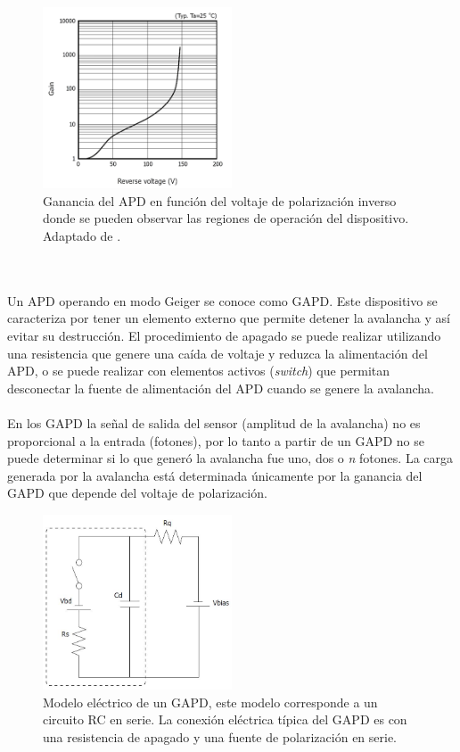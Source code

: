\begin{figure}[h!]
\begin{centering}
  \includegraphics[width=0.5\textwidth]{Images/GAPD_gain.JPG}
  \caption{Ganancia del APD en función del voltaje de polarización inverso donde se pueden observar las regiones de operación del dispositivo. Adaptado de \citep{MPPC_note}.}
  \label{fig:APD_gain}
  \par\end{centering}
\end{figure}
 \\ \\
Un APD operando en modo Geiger se conoce como GAPD. Este dispositivo se caracteriza por tener un elemento externo que permite detener la avalancha y así evitar su destrucción. El procedimiento de apagado se puede realizar utilizando una resistencia que genere una caída de voltaje y reduzca la alimentación del APD, o se puede realizar con elementos activos (\textit{switch}) que permitan desconectar la fuente de alimentación del APD cuando se genere la avalancha.\\ \\
En los GAPD la señal de salida del sensor (amplitud de la avalancha) no es proporcional a la entrada (fotones), por lo tanto a partir de un GAPD no se puede determinar si lo que generó la avalancha fue uno, dos o \textit{n} fotones. La carga generada por la avalancha está determinada únicamente por la ganancia del GAPD que  depende del voltaje de polarización.     
\begin{figure}[h!]
\begin{centering}
  \includegraphics[width=0.5\textwidth]{Images/GAPD_model.JPG}
    \caption{Modelo eléctrico de un GAPD, este modelo corresponde a un circuito RC en serie. La conexión eléctrica típica del GAPD es con una resistencia de apagado y una fuente de polarización en serie.}
    \label{fig:APD_model}
  \par\end{centering}
\end{figure}
